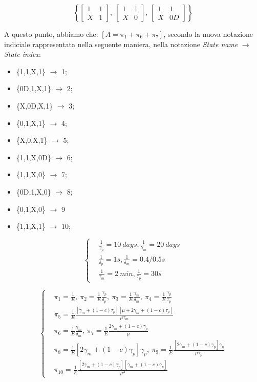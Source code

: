 \[
	\left\{ \begin{bmatrix}1&1\\X&1\end{bmatrix},\ \begin{bmatrix}1&1\\X&0\end{bmatrix},\ \begin{bmatrix}1&1\\X&0D\end{bmatrix} \right\}
\]

A questo punto, abbiamo che: $[A = \pi_1 + \pi_6 + \pi_7]$, secondo la nuova notazione indiciale rappresentata nella seguente maniera, nella notazione \textit{State name} $\rightarrow$ \textit{State index}:

\begin{itemize}
\item{\{1,1,X,1\}} $\rightarrow$ 1;
\item{\{0D,1,X,1\}} $\rightarrow$ 2;
\item{\{X,0D,X,1\}} $\rightarrow$ 3;
\item{\{0,1,X,1\}} $\rightarrow$ 4;
\item{\{X,0,X,1\}} $\rightarrow$ 5;
\item{\{1,1,X,0D\}} $\rightarrow$ 6;
\item{\{1,1,X,0\}} $\rightarrow$ 7;
\item{\{0D,1,X,0\}} $\rightarrow$ 8;
\item{\{0,1,X,0\}} $\rightarrow$ 9
\item{\{1,1,X,1\}} $\rightarrow$ 10;

\end{itemize}

\[
	\left\{
	\begin{aligned}
	&\frac{1}{\gamma_p} = 10\ days, \frac{1}{\gamma_m} = 20\ days\\
	&\frac{1}{\delta_p} = 1 s, \frac{1}{\delta_m} = 0.4/0.5 s\\
	&\frac{1}{\tau_m} = 2\ min, \frac{1}{\tau_p} = 30s
	\end{aligned}
	\right.
\]

\[
	\left\{
	\begin{aligned}
	&\pi_1 = \frac{1}{E},\ \pi_2 = \frac{1}{E} \frac{\gamma_p}{\delta_p},\ \pi_3 = \frac{1}{E} \frac{\gamma_m}{\delta_m},\ \pi_4 = \frac{1}{E} \frac{\gamma_p}{\tau_p}\\
	&\pi_5 = \frac{1}{E} \frac{[\gamma_m + (1-c)\tau_p][\mu + 2\gamma_m + (1-c)\tau_p]}{\mu\tau_m}\\
	&\pi_6 = \frac{1}{E} \frac{\gamma_m}{\delta_m},\ \pi_7 = \frac{1}{E} \frac{2\gamma_m + (1-c)\gamma_p}{\mu}\\
	&\pi_8 = \frac{1}{E} [2\gamma_m + (1-c)\gamma_p]\gamma_p,\ \pi_9 = \frac{1}{E} \frac{[2\gamma_m + (1-c)\gamma_p]\gamma_p}{\mu\tau_p}\\
	&\pi_{10} = \frac{1}{E} \frac{[2\gamma_m + (1-c)\gamma_p][\gamma_m + (1-c)\gamma_p]}{\mu^2}
	\end{aligned}
	\right.
\]

